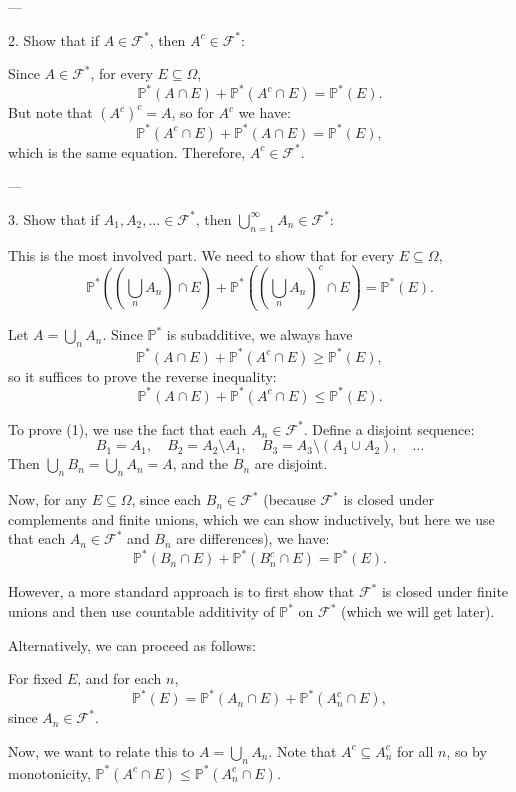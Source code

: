 \documentclass{article}
\newcommand{\1}{\mathds{1}}
\begin{document}
---

       2. Show that if \(A \in \mathcal{F}^*\), then \(A^c \in \mathcal{F}^*\):

Since \(A \in \mathcal{F}^*\), for every \(E \subseteq \Omega\),
\[
\mathbb{P}^*(A \cap E) + \mathbb{P}^*(A^c \cap E) = \mathbb{P}^*(E).
\]
But note that \((A^c)^c = A\), so for \(A^c\) we have:
\[
\mathbb{P}^*(A^c \cap E) + \mathbb{P}^*(A \cap E) = \mathbb{P}^*(E),
\]
which is the same equation. Therefore, \(A^c \in \mathcal{F}^*\).

---

       3. Show that if \(A_1, A_2, \dots \in \mathcal{F}^*\), then \(\bigcup_{n=1}^\infty A_n \in \mathcal{F}^*\):

This is the most involved part. We need to show that for every \(E \subseteq \Omega\),
\[
\mathbb{P}^*\left( \left( \bigcup_n A_n \right) \cap E \right) + \mathbb{P}^*\left( \left( \bigcup_n A_n \right)^c \cap E \right) = \mathbb{P}^*(E).
\]

Let \(A = \bigcup_n A_n\). Since \(\mathbb{P}^*\) is subadditive, we always have
\[
\mathbb{P}^*(A \cap E) + \mathbb{P}^*(A^c \cap E) \geq \mathbb{P}^*(E),
\]
so it suffices to prove the reverse inequality:
\[
\mathbb{P}^*(A \cap E) + \mathbb{P}^*(A^c \cap E) \leq \mathbb{P}^*(E). \tag{1}
\]

To prove (1), we use the fact that each \(A_n \in \mathcal{F}^*\). Define a disjoint sequence:
\[
B_1 = A_1, \quad B_2 = A_2 \setminus A_1, \quad B_3 = A_3 \setminus (A_1 \cup A_2), \quad \dots
\]
Then \(\bigcup_n B_n = \bigcup_n A_n = A\), and the \(B_n\) are disjoint.

Now, for any \(E \subseteq \Omega\), since each \(B_n \in \mathcal{F}^*\) (because \(\mathcal{F}^*\) is closed under complements and finite unions, which we can show inductively, but here we use that each \(A_n \in \mathcal{F}^*\) and \(B_n\) are differences), we have:
\[
\mathbb{P}^*(B_n \cap E) + \mathbb{P}^*(B_n^c \cap E) = \mathbb{P}^*(E). \tag{2}
\]

However, a more standard approach is to first show that \(\mathcal{F}^*\) is closed under finite unions and then use countable additivity of \(\mathbb{P}^*\) on \(\mathcal{F}^*\) (which we will get later).

Alternatively, we can proceed as follows:

For fixed \(E\), and for each \(n\),
\[
\mathbb{P}^*(E) = \mathbb{P}^*(A_n \cap E) + \mathbb{P}^*(A_n^c \cap E),
\]
since \(A_n \in \mathcal{F}^*\).

Now, we want to relate this to \(A = \bigcup_n A_n\). Note that \(A^c \subseteq A_n^c\) for all \(n\), so by monotonicity, \(\mathbb{P}^*(A^c \cap E) \leq \mathbb{P}^*(A_n^c \cap E)\).
\end{document}
